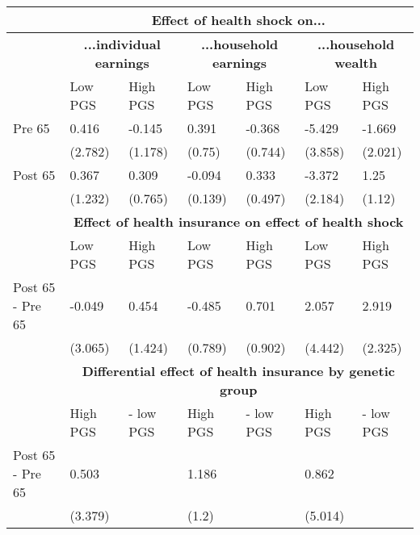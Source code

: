 % 
\begin{tabular}{l| p{2.5cm}p{2.5cm}| p{2.5cm}p{2.5cm}| p{2.5cm}p{2.5cm}}
  & \multicolumn{6}{c}{\textbf{Effect of health shock on...}} \\
 \toprule
  & \multicolumn{2}{c}{ \textbf{...individual earnings}} &  \multicolumn{2}{c}{ \textbf{...household earnings}} &  \multicolumn{2}{c}{ \textbf{...household wealth}}  \\
 \midrule
 & Low PGS & High PGS & Low PGS & High PGS & Low PGS & High PGS \\ 
   \midrule
Pre 65 & 0.416 & -0.145 & 0.391 & -0.368 & -5.429 & -1.669 \\ 
   & (2.782) & (1.178) & (0.75) & (0.744) & (3.858) & (2.021) \\ 
  Post 65 & 0.367 & 0.309 & -0.094 & 0.333 & -3.372 & 1.25 \\ 
   & (1.232) & (0.765) & (0.139) & (0.497) & (2.184) & (1.12) \\ 
   \toprule & \multicolumn{6}{c}{ \textbf{Effect of health insurance on effect of health shock}} \\
 \midrule
 & Low PGS & High PGS & Low PGS & High PGS & Low PGS & High PGS \\ 
   \midrule
Post 65 - Pre 65 & -0.049 & 0.454 & -0.485 & 0.701 & 2.057 & 2.919 \\ 
   & (3.065) & (1.424) & (0.789) & (0.902) & (4.442) & (2.325) \\ 
   \toprule & \multicolumn{6}{c}{ \textbf{Differential effect of health insurance by genetic group}} \\
 \midrule
 & High PGS  & - low PGS & High PGS  & - low PGS & High PGS  & - low PGS \\ 
   \midrule
Post 65 - Pre 65 & 0.503 &  & 1.186 &  & 0.862 &  \\ 
   & (3.379) &  & (1.2) &  & (5.014) &  \\ 
  \end{tabular}
